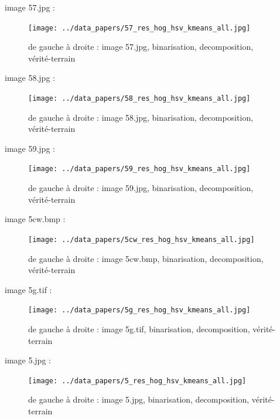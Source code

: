 \documentclass{book}
\begin{document}
image 57.jpg : 
\begin{figure}[H]
\begin{center}
\texttt{[image: ../data\_papers/57\_res\_hog\_hsv\_kmeans\_all.jpg]}
\end{center}
\caption{de gauche à droite : image 57.jpg, binarisation, decomposition, vérité-terrain}
\label{57}
\end{figure}
\clearpage


image 58.jpg : 
\begin{figure}[H]
\begin{center}
\texttt{[image: ../data\_papers/58\_res\_hog\_hsv\_kmeans\_all.jpg]}
\end{center}
\caption{de gauche à droite : image 58.jpg, binarisation, decomposition, vérité-terrain}
\label{58}
\end{figure}
\clearpage


image 59.jpg : 
\begin{figure}[H]
\begin{center}
\texttt{[image: ../data\_papers/59\_res\_hog\_hsv\_kmeans\_all.jpg]}
\end{center}
\caption{de gauche à droite : image 59.jpg, binarisation, decomposition, vérité-terrain}
\label{59}
\end{figure}
\clearpage


image 5cw.bmp : 
\begin{figure}[H]
\begin{center}
\texttt{[image: ../data\_papers/5cw\_res\_hog\_hsv\_kmeans\_all.jpg]}
\end{center}
\caption{de gauche à droite : image 5cw.bmp, binarisation, decomposition, vérité-terrain}
\label{5cw}
\end{figure}
\clearpage


image 5g.tif : 
\begin{figure}[H]
\begin{center}
\texttt{[image: ../data\_papers/5g\_res\_hog\_hsv\_kmeans\_all.jpg]}
\end{center}
\caption{de gauche à droite : image 5g.tif, binarisation, decomposition, vérité-terrain}
\label{5g}
\end{figure}
\clearpage


image 5.jpg : 
\begin{figure}[H]
\begin{center}
\texttt{[image: ../data\_papers/5\_res\_hog\_hsv\_kmeans\_all.jpg]}
\end{center}
\caption{de gauche à droite : image 5.jpg, binarisation, decomposition, vérité-terrain}
\label{5}
\end{figure}
\clearpage
\end{document}
